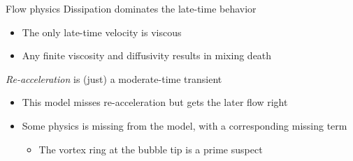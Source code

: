 \documentclass[12pt]{beamer}
\begin{document}
\begin{frame}{Flow physics}
Dissipation dominates the late-time behavior
\begin{itemize}
  \item The only late-time velocity is viscous
  \item Any finite viscosity and diffusivity results in mixing death
\end{itemize}
\vspace{20pt}

\textit{Re-acceleration} is (just) a moderate-time transient
\begin{itemize}
  \item This model misses re-acceleration but gets the later flow right
  \item Some physics is missing from the model, with a corresponding missing term
  \begin{itemize}
    \item The vortex ring at the bubble tip is a prime suspect
  \end{itemize}
\end{itemize}
\end{frame}
\end{document}

